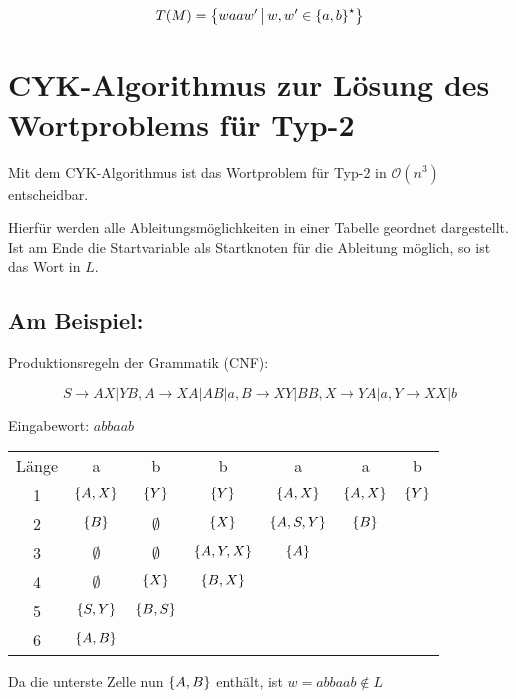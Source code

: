 \begin{equation*}
	T(M)=\left\{ waaw' \,\middle|\, w,w'\in\left\{ a,b \right\}^\star \right\}
\end{equation*}


\section{CYK-Algorithmus zur Lösung des Wortproblems für Typ-2}\label{algo:cyk}
Mit dem CYK-Algorithmus ist das Wortproblem für Typ-2 in $\mathcal O(n^3)$ entscheidbar.

Hierfür werden alle Ableitungsmöglichkeiten in einer Tabelle geordnet dargestellt. Ist am Ende die Startvariable als Startknoten für die Ableitung möglich, so ist das Wort in $L$.


\subsection*{Am Beispiel:}
Produktionsregeln der Grammatik (CNF):

\begin{equation*}
	S\rightarrow AX|YB, A\rightarrow XA|AB|a, B\rightarrow XY|BB, X\rightarrow YA|a, Y\rightarrow XX|b
\end{equation*}

Eingabewort: $abbaab$

\renewcommand{\arraystretch}{1.2}
\begin{tabular}{ccccccc}
	Länge & a & b & b & a & a & b\\
	\cline{2-7}
	1 & \multicolumn{1}{|c|}{$\left\{ A,X \right\}$} & \multicolumn{1}{c|}{$\left\{ Y \right\}$} & \multicolumn{1}{c|}{$\left\{ Y \right\}$} & \multicolumn{1}{c|}{$\left\{ A,X \right\}$} & \multicolumn{1}{c|}{$\left\{ A,X \right\}$} & \multicolumn{1}{c|}{$\left\{ Y \right\}$}\\
	\cline{2-7}
	2 & \multicolumn{1}{|c|}{$\left\{ B \right\}$} & \multicolumn{1}{c|}{$\emptyset$} & \multicolumn{1}{c|}{$\left\{ X \right\}$} & \multicolumn{1}{c|}{$\left\{ A,S,Y \right\}$} & \multicolumn{1}{c|}{$\left\{ B \right\}$} &\\
	\cline{2-6}
	3 & \multicolumn{1}{|c|}{$\emptyset$} & \multicolumn{1}{c|}{$\emptyset$} & \multicolumn{1}{c|}{$\left\{ A,Y,X \right\}$} & \multicolumn{1}{c|}{$\left\{ A \right\}$} &&\\
	\cline{2-5}
	4 & \multicolumn{1}{|c|}{$\emptyset$} & \multicolumn{1}{c|}{$\left\{ X \right\}$} & \multicolumn{1}{c|}{$\left\{ B,X \right\}$} &&&\\
	\cline{2-4}
	5 & \multicolumn{1}{|c|}{$\left\{ S,Y \right\}$} & \multicolumn{1}{c|}{$\left\{ B,S \right\}$} &&&&\\
	\cline{2-3}
	6 & \multicolumn{1}{|c|}{$\left\{ A,B \right\}$} &&&&&\\
	\cline{2-2}
\end{tabular}

Da die unterste Zelle nun $\left\{ A,B \right\}$ enthält, ist $w=abbaab\not\in L$
